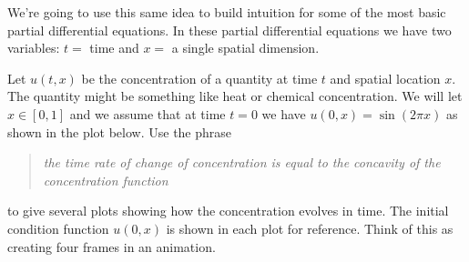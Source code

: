 We're going to use this same idea to build intuition for some of the most basic partial
differential equations.  In these partial differential equations we have two variables:
$t=$ time and $x=$ a single spatial dimension.  

\begin{problem}\label{prob:heat_intuition_1}
    Let $u(t,x)$ be the concentration of a quantity at time $t$ and spatial location $x$.
    The quantity might be something like heat or chemical concentration.
    We will let $x \in [0,1]$ and we assume that at time $t=0$ we have $u(0,x) = \sin(2\pi
    x)$ as shown in the plot below.  Use the phrase 
    \begin{quote}
        {\it the time rate of change of concentration is equal to the concavity of the
        concentration function}
    \end{quote}
    to give several plots showing how the concentration evolves in time. The initial
    condition function $u(0,x)$ is shown in each plot for reference.  Think of this as
    creating four frames in an animation.
    \begin{center}
        \\

\end{center}
\end{problem}
